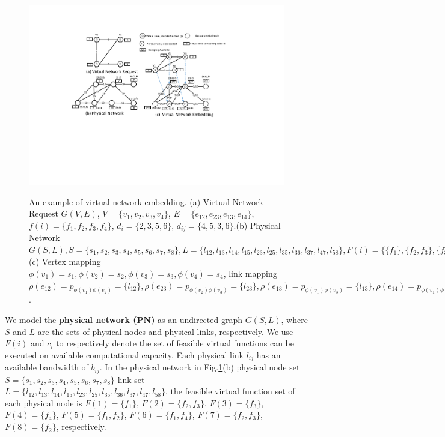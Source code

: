 \begin{figure}
\centering
\includegraphics[width=5in]{Fig/VNQSNVNE}\\
\caption{An example of virtual network embedding. (a) Virtual Network Request $G(V,E)$, $V=\{v_1,v_2,v_3,v_4\}$, $E=\{e_{12},e_{23},e_{13},e_{14}\}$,  $f(i)=\{f_1,f_2,f_3,f_4\}$, $d_i=\{2,3,5,6\}$, $d_{ij}=\{4,5,3,6\}. $(b) Physical Network $G(S,L), S=\{s_1,s_2,s_3,s_4,s_5,s_6,s_7,s_8\}, L=\{l_{12},l_{13},l_{14},l_{15},l_{23},l_{25},l_{35},l_{36},l_{37},l_{47},l_{58}\}, F(i)=\{\{f_1\},\{f_2,f_3\},\{f_3\},\{f_4\},\{f_1,f_2\},\{f_1,f_4\},\{f_2,f_3\},\{f_2\}\}, c_i=\{5,7,7,10,6,9,8,10\}, b_{ij}=\{10,10,10,10,10,10,10,10,10,10,10\}$ (c) Vertex mapping $\phi (v_1)=s_1, \phi(v_2)=s_2, \phi (v_3)=s_3, \phi (v_4)=s_4$, link mapping $\rho(e_{12}) = p_{\phi({v_1}) \phi({v_2})}=\{l_{12}\},\rho(e_{23}) = p_{\phi({v_2}) \phi({v_3})}=\{l_{23}\},\rho(e_{13}) = p_{\phi({v_1}) \phi({v_3})}=\{l_{13}\},\rho(e_{14}) = p_{\phi({v_1}) \phi({v_4})}=\{l_{14}\}$.}\label{fig:VNQSNVNE}
\end{figure}


We model the \textbf{physical network (PN)} as an undirected graph $G (S,L)$, where $S$ and $L$ are the sets of physical nodes and physical links, respectively.
  We use $F(i)$ and $c_i$ to respectively denote the set of feasible virtual functions  can be executed on  available computational capacity. Each physical link $l_{ij}$ has an available bandwidth of $b_{ij}$. In  the physical network in Fig.\ref{fig:VNQSNVNE}(b)  physical node set $S=\{s_1,s_2,s_3,s_4,s_5,s_6,s_7,s_8\}$   link set $L=\{l_{12},l_{13},l_{14},l_{15},l_{23},l_{25},l_{35},l_{36},l_{37},l_{47},l_{58}\}$, the  feasible virtual function set of each physical node is  $F(1)=\{f_1\}$, $F(2)=\{f_2,f_3\}$, $F(3)=\{f_3\}$, $F(4)=\{f_4\}$, $F(5)=\{f_1,f_2\}$, $F(6)=\{f_1,f_4\}$, $F(7)=\{f_2,f_3\}$,$F(8)=\{f_2\}$, respectively.



